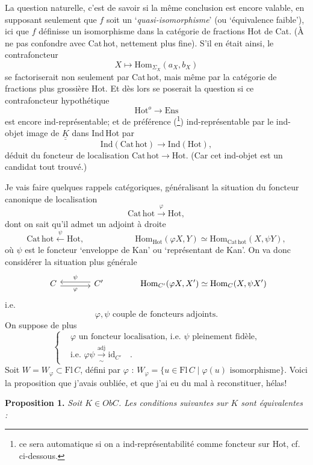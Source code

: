 \documentclass[11pt]{article}
\newcommand{\printedpage}[1]{\marginpar{\footnotesize p.~#1}}
\newcommand{\msp}[1]{\marginpar{\footnotesize [#1]}}
\newcommand{\KK}{\underline{\underline{K}}}
\newcommand{\Cathot}{\mathrm{Cat\,hot}}
\begin{document}
La question naturelle, c'est de savoir si la même conclusion est encore valable, en supposant seulement que $f$ soit un ‘\textit{quasi-isomorphisme}’ (ou ‘équivalence faible’), ici que $f$ définisse un isomorphisme dans la catégorie de fractions Hot de Cat. (À ne pas confondre avec Cat\,hot,
\printedpage{22}
\msp{page 36}
nettement plus fine). S'il en était ainsi, le contrafoncteur
\[
X\longmapsto\mathrm{Hom}_{\Sigma_X}(a_X,b_X)
\]
se factoriserait non seulement par Cat\,hot, mais même par la catégorie de fractions plus grossière Hot. Et dès lors se poserait la question si ce contrafoncteur hypothétique
\[
\mathrm{Hot}^{o}\longrightarrow\mathrm{Ens}
\]
est encore ind-représentable; et de préférence (\footnote[5]{ce sera automatique si on a ind-représentabilité comme foncteur sur Hot, cf. ci-dessous.}) ind-représentable par le ind-objet image de $\KK$ dans Ind\,Hot par
\[
\mathrm{Ind}(\Cathot)\longrightarrow\mathrm{Ind}(\mathrm{Hot}),
\]
déduit du foncteur de localisation $\Cathot\longrightarrow\mathrm{Hot}$. (Car cet ind-objet est un candidat tout trouvé.)

\msp{page 37}
Je vais faire quelques rappels catégoriques, généralisant la situation du foncteur canonique de localisation
\[
\Cathot\xrightarrow{\ \varphi\ }\mathrm{Hot},
\]
dont on sait qu'il admet un adjoint à droite 
\[
\Cathot\xleftarrow{\ \psi\ }\mathrm{Hot}, \qquad\qquad\qquad \mathrm{Hom}_{\mathrm{Hot}}(\varphi X,Y)\simeq\mathrm{Hom}_{\Cathot}(X,\psi Y),
\]
où $\psi$ est le foncteur ‘enveloppe de Kan’ ou ‘représentant de Kan’. On va donc considérer la situation plus générale
\[
\begin{tikzcd}[column sep=large]
C \arrow[r, shift right=1, "\varphi"'] & C' \arrow[l, shift right=1, "\psi"']
\end{tikzcd}
\qquad\qquad \mathrm{Hom}_{C'}(\varphi X,X')\simeq\mathrm{Hom}_{C}(X,\psi X')
\]
i.e.
\[
\varphi,\psi \text{ couple de foncteurs adjoints.}
\]
On suppose de plus
\[
\left\{
\begin{aligned}
&\varphi \text{ un foncteur localisation, i.e. } \psi \text{ pleinement fidèle,}\\
&\text{i.e. } \varphi\psi\xrightarrow[\sim]{\text{adj}}\mathrm{id}_{C'} \quad .
\end{aligned}
\right.
\]
Soit $W=W_{\varphi}\subset\mathrm{Fl}\,C$, défini par $\varphi$ : $W_{\varphi}=\{u\in\mathrm{Fl}\,C\mid\varphi(u)\text{ isomorphisme}\}$. Voici la proposition que j'avais oubliée, et que j'ai eu du mal à reconstituer, hélas!

\textbf{Proposition 1.} \textit{Soit $K\in \mathit{Ob}C$. Les conditions suivantes sur $K$ sont équivalentes :}
\end{document}
